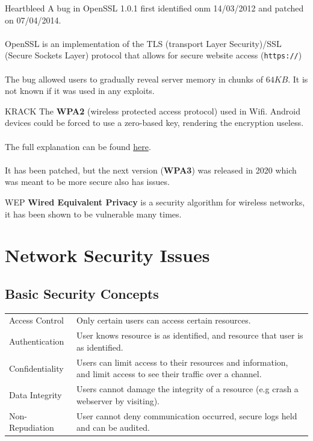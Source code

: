 \begin{definitionbox}{Heartbleed}
    A bug in OpenSSL 1.0.1 first identified onm 14/03/2012 and patched on 07/04/2014.
    \\
    \\ OpenSSL is an implementation of the TLS (transport Layer Security)/SSL (Secure Sockets Layer) protocol that allows for secure website access (\lstinline{https://})
    \\
    \\ The bug allowed users to gradually reveal server memory in chunks of $64KB$. It is not known if it was used in any exploits.
\end{definitionbox}
\begin{definitionbox}{KRACK}
    The \textbf{WPA2} (wireless protected access protocol) used in Wifi. Android devices could be forced to use a zero-based key, rendering the encryption useless.
    \\
    \\ The full explanation can be found \href{https://www.krackattacks.com/}{here}.
    \\
    \\ It has been patched, but the next version (\textbf{WPA3}) was released in 2020 which was meant to be more secure also has issues.
\end{definitionbox}
\begin{definitionbox}{WEP}
    \textbf{Wired Equivalent Privacy} is a security algorithm for wireless networks, it has been shown to be vulnerable many times.
\end{definitionbox}

\section{Network Security Issues}
\subsection{Basic Security Concepts}
\begin{center}
    \begin{tabular}{l p{}}
        Access Control  & Only certain users can access certain resources.                                                                 \\
        Authentication  & User knows resource is as identified, and resource that user is as identified.                                   \\
        Confidentiality & Users can limit access to their resources and information, and limit access to see their traffic over a channel. \\
        Data Integrity  & Users cannot damage the integrity of a resource (e.g crash a webserver by visiting).                             \\
        Non-Repudiation & User cannot deny communication occurred, secure logs held and can be audited.                                    \\
    \end{tabular}
\end{center}

